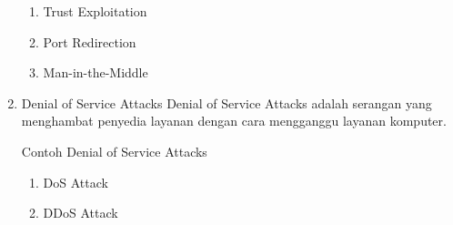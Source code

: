 \documentclass{article}
\begin{document}
\begin{flushleft}
\begin{enumerate}
\begin{enumerate}
                \item Trust Exploitation
                \item Port Redirection
                \item Man-in-the-Middle
            \end{enumerate}

            \item Denial of Service Attacks \newline
            Denial of Service Attacks adalah serangan yang menghambat penyedia layanan dengan cara mengganggu layanan komputer.

            Contoh Denial of Service Attacks
            \begin{enumerate}
                \item DoS Attack
                \item DDoS Attack
            \end{enumerate}
        \end{enumerate}
    \end{flushleft}
\end{document}
